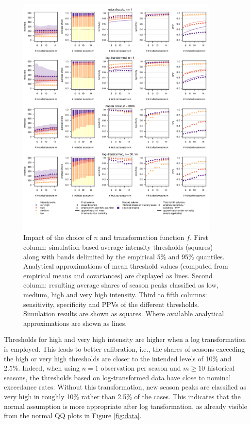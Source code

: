 \documentclass[12pt]{article}
\begin{document}
\begin{figure}[h!]
\centering
\includegraphics[width=0.9\textwidth]{figure/plot_fr.pdf}

\vspace{-1.5cm}

\caption{Impact of the choice of $n$ and transformation function $f$. First column: simulation-based average intensity thresholds (squares) along with bands delimited by the empirical 5\% and 95\% quantiles. Analytical approximations of mean threshold values (computed from empirical means and covariances) are displayed as lines. Second column: resulting average shares of season peaks classified as low, medium, high and very high intensity. Third to fifth columns: sensitivity, specificity and PPVs of the different thresholds. Simulation results are shown as squares. Where available analytical approximations are shown as lines.}
\label{fig:results1}
\end{figure}

Thresholds for high and very high intensity are higher when a log transformation is employed. This leads to better calibration, i.e., the shares of seasons exceeding the high or very high thresholds are closer to the intended levels of 10\% and 2.5\%. Indeed, when using $n = 1$ observation per season and $m \geq 10$ historical seasons, the thresholds based on log-transformed data have close to nominal exceedance rates. Without this transformation, new season peaks are classified as very high in roughly 10\% rather than 2.5\% of the cases. This indicates that the normal assumption is more appropriate after log tansformation, as already visible from the normal QQ plots in Figure \ref{fig:data}.
\end{document}
